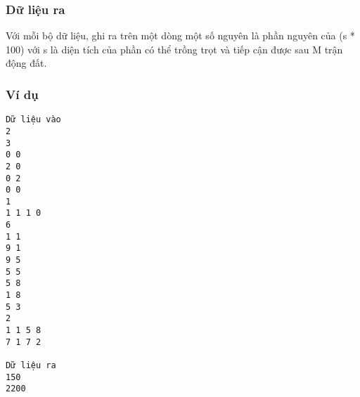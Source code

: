 \subsubsection{   Dữ liệu ra  }

   Với mỗi bộ dữ liệu, ghi ra trên một dòng một số nguyên là phần nguyên của (s * 100) với s là diện tích của phần có thể trồng trọt và tiếp cận được sau M trận động đất.  

\subsubsection{   Ví dụ  }
\begin{verbatim}
Dữ liệu vào
2
3
0 0
2 0
0 2
0 0
1
1 1 1 0
6
1 1
9 1
9 5
5 5
5 8
1 8
5 3
2
1 1 5 8
7 1 7 2	

Dữ liệu ra
150
2200
\end{verbatim}